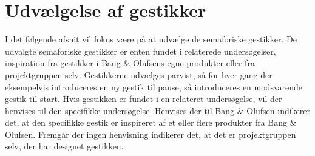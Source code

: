 \section{Udvælgelse af gestikker}
\label{UdvaelgelseAfGestikker}
%
I det følgende afsnit vil fokus være på at udvælge de semaforiske gestikker. De udvalgte semaforiske gestikker er enten fundet i relaterede undersøgelser, inspiration fra gestikker i Bang $\&$ Olufsens egne produkter eller fra projektgruppen selv. Gestikkerne udvælges parvist, så for hver gang der eksempelvis introduceres en ny gestik til pause, så introduceres en modsvarende gestik til start. Hvis gestikken er fundet i en relateret undersøgelse, vil der henvises til den specifikke undersøgelse. Henvises der til Bang $\&$ Olufsen indikerer det, at den specifikke gestik er inspireret af et eller flere produkter fra Bang $\&$ Olufsen. Fremgår der ingen henvisning indikerer det, at det er projektgruppen selv, der har designet gestikken.  

